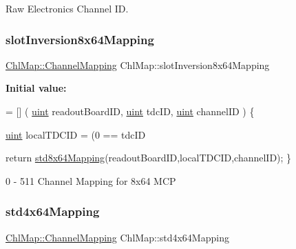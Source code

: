 Raw Electronics Channel ID. 

\mbox{\label{namespace_chl_map_ab1f62d041d8393301f88f6290753a519}} 
\subsubsection{\texorpdfstring{slot\+Inversion8x64\+Mapping}{slotInversion8x64Mapping}}
{\footnotesize\ttfamily \hyperlink{namespace_chl_map_a02f93d10e11f82c0ea2330212cf70545}{Chl\+Map\+::\+Channel\+Mapping} Chl\+Map\+::slot\+Inversion8x64\+Mapping}

{\bfseries Initial value\+:}
\begin{DoxyCode}
= [] (
    \hyperlink{_channel_mappings_8cpp_a69aa29b598b851b0640aa225a9e5d61d}{uint} readoutBoardID,
    \hyperlink{_channel_mappings_8cpp_a69aa29b598b851b0640aa225a9e5d61d}{uint} tdcID,
    \hyperlink{_channel_mappings_8cpp_a69aa29b598b851b0640aa225a9e5d61d}{uint} channelID
) \{
    
    \hyperlink{_channel_mappings_8cpp_a69aa29b598b851b0640aa225a9e5d61d}{uint} localTDCID = (0 == tdcID%

    
    \textcolor{keywordflow}{return} \hyperlink{namespace_chl_map_a615e236287cdfca8b2521b4280e3c972}{std8x64Mapping}(readoutBoardID,localTDCID,channelID);
\}
\end{DoxyCode}


0 -\/ 511 Channel Mapping for 8x64 M\+CP 

\mbox{\label{namespace_chl_map_a12fcd0b1200b8a5db9a23360a588719d}} 
\subsubsection{\texorpdfstring{std4x64\+Mapping}{std4x64Mapping}}
{\footnotesize\ttfamily \hyperlink{namespace_chl_map_a02f93d10e11f82c0ea2330212cf70545}{Chl\+Map\+::\+Channel\+Mapping} Chl\+Map\+::std4x64\+Mapping}

